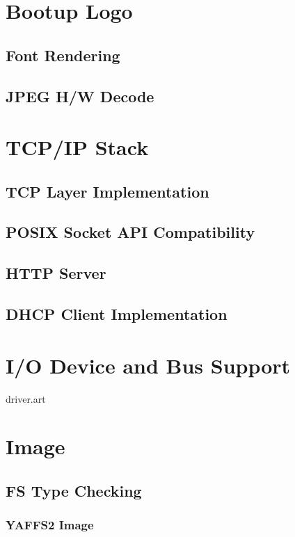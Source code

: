 \documentclass[a4paper,11pt]{book}
\begin{document}
\begin{CJK*}{UTF8}{gbsn}
\chapter{Bootup Logo}

\section{Font Rendering}

\section{JPEG H/W Decode}

\chapter{TCP/IP Stack}

\section{TCP Layer Implementation}

\section{POSIX Socket API Compatibility}

\section{HTTP Server}

\section{DHCP Client Implementation}

\chapter{I/O Device and Bus Support}
 {driver.art}

\chapter{Image}

\section{FS Type Checking}

\subsection{YAFFS2 Image}


\end{CJK*}
\end{document}
